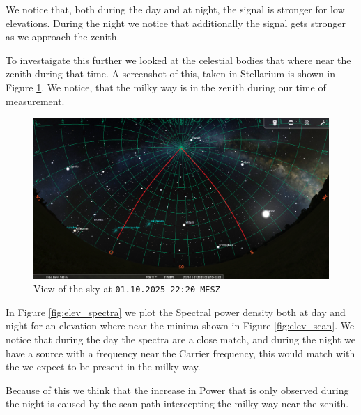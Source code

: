 We notice that, both during the day and at night, the signal is stronger for low elevations. During the night we notice that additionally the signal gets stronger as we approach the zenith.

To investaigate this further we looked at the celestial bodies that where near the zenith during that time. A screenshot of this, taken in Stellarium is shown in Figure \ref{fig:stellarium}. We notice, that the milky way is in the zenith during our time of measurement.

\begin{figure}[h]
    \centering
    \includegraphics[width=0.5\linewidth]{assets/ElevationScan_Az90_Az180_251001_2220MESZ.png}
    \caption{View of the sky at \texttt{01.10.2025 22:20 MESZ}}
    \label{fig:stellarium}
\end{figure}

In Figure \ref{fig:elev_spectra} we plot the Spectral power density both at day and night for an elevation where near the minima shown in Figure \ref{fig:elev_scan}. We notice that during the day the spectra are a close match, and during the night we have a source with a frequency near the Carrier frequency, this would match with the  we expect to be present in the milky-way.

Because of this we think that the increase in Power that is only observed during the night is caused by the scan path intercepting the milky-way near the zenith.

